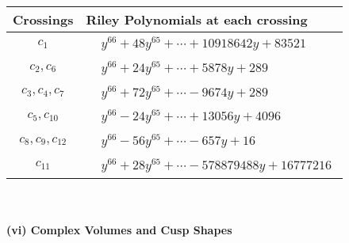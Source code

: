 \documentclass[1p]{elsarticle_modified}
\theoremstyle{definition}
\begin{document}
\begin{tabular}{m{50pt}|m{274pt}}
Crossings & \hspace{64pt}Riley Polynomials at each crossing \\
\hline $$\begin{aligned}c_{1}\end{aligned}$$&$\begin{aligned}
&y^{66}+48 y^{65}+\cdots+10918642 y+83521
\end{aligned}$\\
\hline $$\begin{aligned}c_{2},c_{6}\end{aligned}$$&$\begin{aligned}
&y^{66}+24 y^{65}+\cdots+5878 y+289
\end{aligned}$\\
\hline $$\begin{aligned}c_{3},c_{4},c_{7}\end{aligned}$$&$\begin{aligned}
&y^{66}+72 y^{65}+\cdots-9674 y+289
\end{aligned}$\\
\hline $$\begin{aligned}c_{5},c_{10}\end{aligned}$$&$\begin{aligned}
&y^{66}-24 y^{65}+\cdots+13056 y+4096
\end{aligned}$\\
\hline $$\begin{aligned}c_{8},c_{9},c_{12}\end{aligned}$$&$\begin{aligned}
&y^{66}-56 y^{65}+\cdots-657 y+16
\end{aligned}$\\
\hline $$\begin{aligned}c_{11}\end{aligned}$$&$\begin{aligned}
&y^{66}+28 y^{65}+\cdots-578879488 y+16777216
\end{aligned}$\\
\hline
\end{tabular}\\~\\
\newpage\flushleft \textbf{(vi) Complex Volumes and Cusp Shapes}
\end{document}

